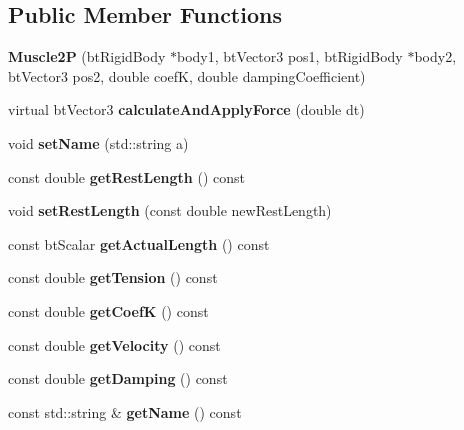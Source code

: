 \subsection*{Public Member Functions}
\begin{DoxyCompactItemize}
\item 
\hypertarget{class_muscle2_p_a40330fc015e5c94f4399ef85d208f8aa}{{\bfseries Muscle2\-P} (bt\-Rigid\-Body $\ast$body1, bt\-Vector3 pos1, bt\-Rigid\-Body $\ast$body2, bt\-Vector3 pos2, double coef\-K, double damping\-Coefficient)}\label{class_muscle2_p_a40330fc015e5c94f4399ef85d208f8aa}

\item 
\hypertarget{class_muscle2_p_ae141abee246b1ccd793edb5d82905bd1}{virtual bt\-Vector3 {\bfseries calculate\-And\-Apply\-Force} (double dt)}\label{class_muscle2_p_ae141abee246b1ccd793edb5d82905bd1}

\item 
\hypertarget{class_muscle2_p_aa7159a907dd685338094a2eff7be901e}{void {\bfseries set\-Name} (std\-::string a)}\label{class_muscle2_p_aa7159a907dd685338094a2eff7be901e}

\item 
\hypertarget{class_muscle2_p_aee74a571820256a3df1c1226b1b6087f}{const double {\bfseries get\-Rest\-Length} () const }\label{class_muscle2_p_aee74a571820256a3df1c1226b1b6087f}

\item 
\hypertarget{class_muscle2_p_a7ec5f30150414d24d585d05851aa7d6e}{void {\bfseries set\-Rest\-Length} (const double new\-Rest\-Length)}\label{class_muscle2_p_a7ec5f30150414d24d585d05851aa7d6e}

\item 
\hypertarget{class_muscle2_p_a657c3eb6b6083e40689619e88d9e9689}{const bt\-Scalar {\bfseries get\-Actual\-Length} () const }\label{class_muscle2_p_a657c3eb6b6083e40689619e88d9e9689}

\item 
\hypertarget{class_muscle2_p_a696a49a9e8c1868abcf0b09bda491d60}{const double {\bfseries get\-Tension} () const }\label{class_muscle2_p_a696a49a9e8c1868abcf0b09bda491d60}

\item 
\hypertarget{class_muscle2_p_ad4822193c313a7f19938c667bcfa6161}{const double {\bfseries get\-Coef\-K} () const }\label{class_muscle2_p_ad4822193c313a7f19938c667bcfa6161}

\item 
\hypertarget{class_muscle2_p_a527465b6e1951703158689915e2f37df}{const double {\bfseries get\-Velocity} () const }\label{class_muscle2_p_a527465b6e1951703158689915e2f37df}

\item 
\hypertarget{class_muscle2_p_ac4c36c376282f9a4a406d6153d461c10}{const double {\bfseries get\-Damping} () const }\label{class_muscle2_p_ac4c36c376282f9a4a406d6153d461c10}

\item 
\hypertarget{class_muscle2_p_acbd915730421056eb20fec664fcacb6a}{const std\-::string \& {\bfseries get\-Name} () const }\label{class_muscle2_p_acbd915730421056eb20fec664fcacb6a}

\end{DoxyCompactItemize}

